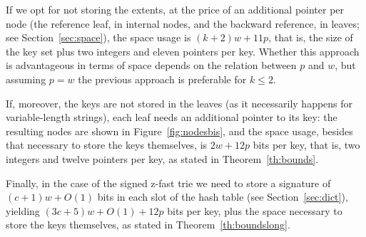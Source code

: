 \documentclass[a4paper]{article}
\newcommand{\?}{\mskip1.5mu}
\begin{document}
If we opt for not storing the extents, at the price of an additional pointer per node (the reference leaf, in internal nodes, and the 
backward reference, in leaves; see Section~\ref{sec:space}), the space usage is $(k + 2)w +11p$, that is, the size of the key set plus
two integers and eleven pointers per key. Whether this
approach is advantageous in terms of space depends on the relation between $p$ and $w$, but assuming $p=w$ the previous approach is
preferable for $k\leq 2$.  

If, moreover, the keys are not stored in the leaves (as it necessarily happens for variable-length strings), each leaf needs 
an additional pointer to its key: the resulting nodes are shown in Figure~\ref{fig:nodesbis}, and the space usage, 
besides that necessary to store the keys themselves, is $2w+12p$ bits per key, that is, two integers and twelve pointers per key,
as stated in Theorem~\ref{th:bounds}.

Finally, in the case of the signed z-fast trie we need to store a signature of $(c+1)w + O(1)$ bits in each slot of the hash table 
(see Section~\ref{sec:dict}), yielding $(3c + 5)w + O(1) +12p$ bits per key, plus the space necessary to store the keys themselves, as stated in Theorem~\ref{th:boundslong}.
\end{document}
